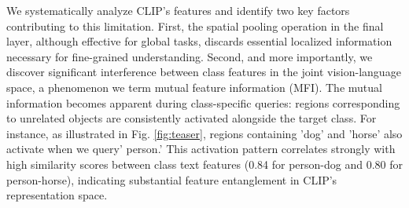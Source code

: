 We systematically analyze CLIP's features and identify two key factors contributing to this limitation. First, the spatial pooling operation in the final layer, although effective for global tasks, discards essential localized information necessary for fine-grained understanding. Second, and more importantly, we discover significant interference between class features in the joint vision-language space, a phenomenon we term mutual feature information (MFI). The mutual information becomes apparent during class-specific queries: regions corresponding to unrelated objects are consistently activated alongside the target class. For instance, as illustrated in Fig. \ref{fig:teaser}, regions containing 'dog' and 'horse' also activate when we query' person.' This activation pattern correlates strongly with high similarity scores between class text features (0.84 for person-dog and 0.80 for person-horse), indicating substantial feature entanglement in CLIP's representation space.



